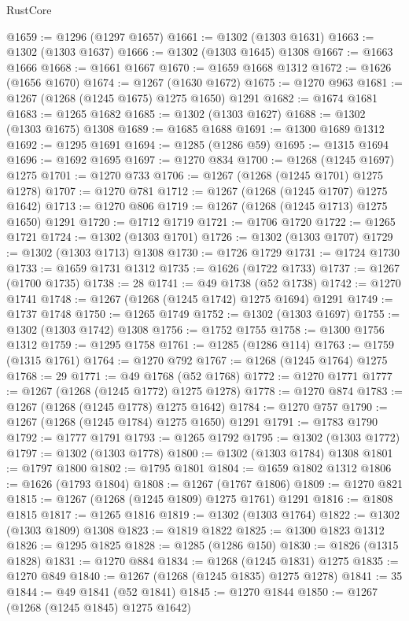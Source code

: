 \begin{lexlean}{RustCore}
\begin{coremodule}
@1659 := @1296 (@1297 @1657)
@1661 := @1302 (@1303 @1631)
@1663 := @1302 (@1303 @1637)
@1666 := @1302 (@1303 @1645) @1308
@1667 := @1663 @1666
@1668 := @1661 @1667
@1670 := @1659 @1668 @1312
@1672 := @1626 (@1656 @1670)
@1674 := @1267 (@1630 @1672)
@1675 := @1270 @963
@1681 := @1267 (@1268 (@1245 @1675) @1275 @1650) @1291
@1682 := @1674 @1681
@1683 := @1265 @1682
@1685 := @1302 (@1303 @1627)
@1688 := @1302 (@1303 @1675) @1308
@1689 := @1685 @1688
@1691 := @1300 @1689 @1312
@1692 := @1295 @1691
@1694 := @1285 (@1286 @59)
@1695 := @1315 @1694
@1696 := @1692 @1695
@1697 := @1270 @834
@1700 := @1268 (@1245 @1697) @1275
@1701 := @1270 @733
@1706 := @1267 (@1268 (@1245 @1701) @1275 @1278)
@1707 := @1270 @781
@1712 := @1267 (@1268 (@1245 @1707) @1275 @1642)
@1713 := @1270 @806
@1719 := @1267 (@1268 (@1245 @1713) @1275 @1650) @1291
@1720 := @1712 @1719
@1721 := @1706 @1720
@1722 := @1265 @1721
@1724 := @1302 (@1303 @1701)
@1726 := @1302 (@1303 @1707)
@1729 := @1302 (@1303 @1713) @1308
@1730 := @1726 @1729
@1731 := @1724 @1730
@1733 := @1659 @1731 @1312
@1735 := @1626 (@1722 @1733)
@1737 := @1267 (@1700 @1735)
@1738 := 28
@1741 := @49 @1738 (@52 @1738)
@1742 := @1270 @1741
@1748 := @1267 (@1268 (@1245 @1742) @1275 @1694) @1291
@1749 := @1737 @1748
@1750 := @1265 @1749
@1752 := @1302 (@1303 @1697)
@1755 := @1302 (@1303 @1742) @1308
@1756 := @1752 @1755
@1758 := @1300 @1756 @1312
@1759 := @1295 @1758
@1761 := @1285 (@1286 @114)
@1763 := @1759 (@1315 @1761)
@1764 := @1270 @792
@1767 := @1268 (@1245 @1764) @1275
@1768 := 29
@1771 := @49 @1768 (@52 @1768)
@1772 := @1270 @1771
@1777 := @1267 (@1268 (@1245 @1772) @1275 @1278)
@1778 := @1270 @874
@1783 := @1267 (@1268 (@1245 @1778) @1275 @1642)
@1784 := @1270 @757
@1790 := @1267 (@1268 (@1245 @1784) @1275 @1650) @1291
@1791 := @1783 @1790
@1792 := @1777 @1791
@1793 := @1265 @1792
@1795 := @1302 (@1303 @1772)
@1797 := @1302 (@1303 @1778)
@1800 := @1302 (@1303 @1784) @1308
@1801 := @1797 @1800
@1802 := @1795 @1801
@1804 := @1659 @1802 @1312
@1806 := @1626 (@1793 @1804)
@1808 := @1267 (@1767 @1806)
@1809 := @1270 @821
@1815 := @1267 (@1268 (@1245 @1809) @1275 @1761) @1291
@1816 := @1808 @1815
@1817 := @1265 @1816
@1819 := @1302 (@1303 @1764)
@1822 := @1302 (@1303 @1809) @1308
@1823 := @1819 @1822
@1825 := @1300 @1823 @1312
@1826 := @1295 @1825
@1828 := @1285 (@1286 @150)
@1830 := @1826 (@1315 @1828)
@1831 := @1270 @884
@1834 := @1268 (@1245 @1831) @1275
@1835 := @1270 @849
@1840 := @1267 (@1268 (@1245 @1835) @1275 @1278)
@1841 := 35
@1844 := @49 @1841 (@52 @1841)
@1845 := @1270 @1844
@1850 := @1267 (@1268 (@1245 @1845) @1275 @1642)

\end{coremodule}
\end{lexlean}
